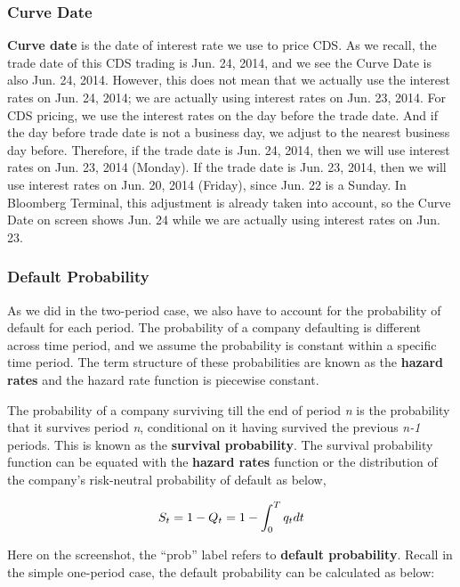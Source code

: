 \documentclass{jss}
\begin{document}
\subsubsection{Curve Date}
\textbf{Curve date} is the date of interest rate we use to price CDS. As we recall, the trade date of this CDS trading is Jun. 24, 2014, and we see the Curve Date is also Jun. 24, 2014. However, this does not mean that we actually use the interest rates on Jun. 24, 2014; we are actually using interest rates on Jun. 23, 2014. For CDS pricing, we use the interest rates on the day before the trade date. And if the day before trade date is not a business day, we adjust to the nearest business day before. Therefore, if the trade date is Jun. 24, 2014, then we will use interest rates on Jun. 23, 2014 (Monday). If the trade date is Jun. 23, 2014, then we will use interest rates on Jun. 20, 2014 (Friday), since Jun. 22 is a Sunday. In Bloomberg Terminal, this adjustment is already taken into account, so the Curve Date on screen shows Jun. 24 while we are actually using interest rates on Jun. 23.
\\
\subsubsection{Default Probability}
\label{sec:DefaultProb}

As we did in the two-period case, we also have to account for the probability of default for each period. The probability of a company defaulting is different across time period, and we assume the probability is constant within a specific time period. The term structure of these probabilities are known as the \textbf{hazard rates} and the hazard rate function is piecewise constant.  

The probability of a company surviving till the end of period \textit{n} is the probability that it survives period \textit{n}, conditional on it having survived the previous \textit{n-1} periods. This is known as the \textbf{survival probability}. The survival probability function can be equated with the \textbf{hazard rates} function or the distribution of the company's risk-neutral probability of default as below,

\begin{displaymath}
S_t = 1 - Q_t = 1 - \int_0^T q_t dt\, \nonumber\\
\end{displaymath}

Here on the screenshot, the ``prob'' label refers to \textbf{default probability}. Recall in the simple one-period case, the default probability can be calculated as below:
\end{document}
